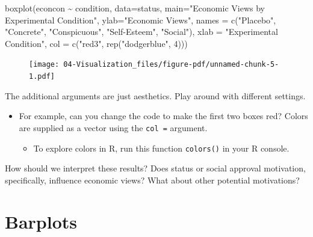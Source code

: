 \documentclass[
  letterpaper,
  DIV=11,
  numbers=noendperiod]{scrreprt}
\newenvironment{Shaded}{\begin{snugshade}}{\end{snugshade}}
\newcommand{\AttributeTok}[1]{\textcolor[rgb]{0.40,0.45,0.13}{#1}}
\newcommand{\DecValTok}[1]{\textcolor[rgb]{0.68,0.00,0.00}{#1}}
\newcommand{\FunctionTok}[1]{\textcolor[rgb]{0.28,0.35,0.67}{#1}}
\newcommand{\NormalTok}[1]{\textcolor[rgb]{0.00,0.23,0.31}{#1}}
\newcommand{\SpecialCharTok}[1]{\textcolor[rgb]{0.37,0.37,0.37}{#1}}
\newcommand{\StringTok}[1]{\textcolor[rgb]{0.13,0.47,0.30}{#1}}
\providecommand{\tightlist}{%
  \setlength{\itemsep}{0pt}\setlength{\parskip}{0pt}}\usepackage{longtable,booktabs,array}
\begin{document}
\begin{Shaded}
\begin{Highlighting}[]
\FunctionTok{boxplot}\NormalTok{(econcon }\SpecialCharTok{\textasciitilde{}}\NormalTok{ condition, }\AttributeTok{data=}\NormalTok{status,}
        \AttributeTok{main=}\StringTok{"Economic Views by Experimental Condition"}\NormalTok{,}
        \AttributeTok{ylab=}\StringTok{"Economic Views"}\NormalTok{,}
        \AttributeTok{names =} \FunctionTok{c}\NormalTok{(}\StringTok{"Placebo"}\NormalTok{, }\StringTok{"Concrete"}\NormalTok{, }\StringTok{"Conspicuous"}\NormalTok{, }
                  \StringTok{"Self{-}Esteem"}\NormalTok{, }\StringTok{"Social"}\NormalTok{),}
        \AttributeTok{xlab =} \StringTok{"Experimental Condition"}\NormalTok{,}
        \AttributeTok{col =} \FunctionTok{c}\NormalTok{(}\StringTok{"red3"}\NormalTok{, }\FunctionTok{rep}\NormalTok{(}\StringTok{"dodgerblue"}\NormalTok{, }\DecValTok{4}\NormalTok{)))}
\end{Highlighting}
\end{Shaded}

\begin{figure}[H]

{\centering \texttt{[image: 04-Visualization\_files/figure-pdf/unnamed-chunk-5-1.pdf]}

}

\end{figure}

The additional arguments are just aesthetics. Play around with different
settings.

\begin{itemize}
\tightlist
\item
  For example, can you change the code to make the first two boxes red?
  Colors are supplied as a vector using the \texttt{col\ =} argument.

  \begin{itemize}
  \tightlist
  \item
    To explore colors in R, run this function \texttt{colors()} in your
    R console.
  \end{itemize}
\end{itemize}

How should we interpret these results? Does status or social approval
motivation, specifically, influence economic views? What about other
potential motivations?

\hypertarget{barplots}{%
\section{Barplots}\label{barplots}}
\end{document}
